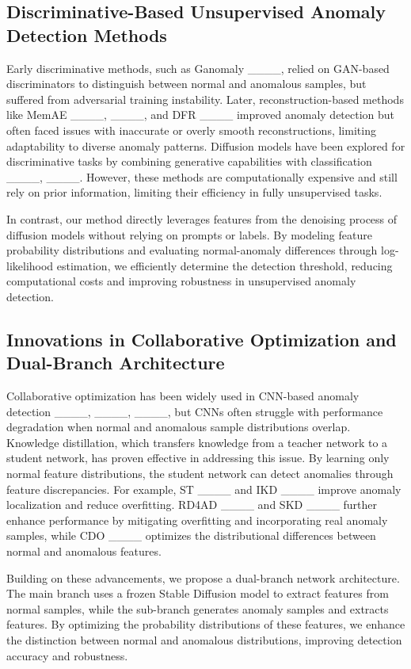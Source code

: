 \subsection{Discriminative-Based Unsupervised Anomaly Detection Methods}

Early discriminative methods, such as Ganomaly ____, relied on GAN-based discriminators to distinguish between normal and anomalous samples, but suffered from adversarial training instability. Later, reconstruction-based methods like MemAE ____, ____, and DFR ____ improved anomaly detection but often faced issues with inaccurate or overly smooth reconstructions, limiting adaptability to diverse anomaly patterns.
Diffusion models have been explored for discriminative tasks by combining generative capabilities with classification ____, ____. However, these methods are computationally expensive and still rely on prior information, limiting their efficiency in fully unsupervised tasks.

In contrast, our method directly leverages features from the denoising process of diffusion models without relying on prompts or labels. By modeling feature probability distributions and evaluating normal-anomaly differences through log-likelihood estimation, we efficiently determine the detection threshold, reducing computational costs and improving robustness in unsupervised anomaly detection.


\subsection{Innovations in Collaborative Optimization and Dual-Branch Architecture}

Collaborative optimization has been widely used in CNN-based anomaly detection ____, ____, ____, but CNNs often struggle with performance degradation when normal and anomalous sample distributions overlap. Knowledge distillation, which transfers knowledge from a teacher network to a student network, has proven effective in addressing this issue. By learning only normal feature distributions, the student network can detect anomalies through feature discrepancies. For example, ST ____ and IKD ____ improve anomaly localization and reduce overfitting. RD4AD ____ and SKD ____ further enhance performance by mitigating overfitting and incorporating real anomaly samples, while CDO ____ optimizes the distributional differences between normal and anomalous features.

Building on these advancements, we propose a dual-branch network architecture. The main branch uses a frozen Stable Diffusion model to extract features from normal samples, while the sub-branch generates anomaly samples and extracts features. By optimizing the probability distributions of these features, we enhance the distinction between normal and anomalous distributions, improving detection accuracy and robustness.